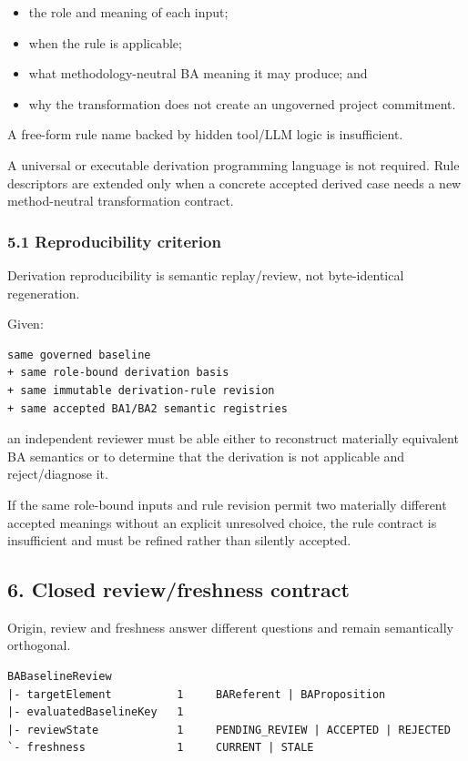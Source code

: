 \documentclass[11pt,a4paper]{article}
\providecommand{\tightlist}{\setlength{\itemsep}{0pt}\setlength{\parskip}{0pt}}
\begin{document}
\begin{itemize}
\tightlist
\item
  the role and meaning of each input;
\item
  when the rule is applicable;
\item
  what methodology-neutral BA meaning it may produce; and
\item
  why the transformation does not create an ungoverned project commitment.
\end{itemize}

A free-form rule name backed by hidden tool/LLM logic is insufficient.

A universal or executable derivation programming language is not required. Rule descriptors are extended only when a concrete accepted derived case needs a new method-neutral transformation contract.

\subsubsection{5.1 Reproducibility criterion}\label{reproducibility-criterion}

Derivation reproducibility is semantic replay/review, not byte-identical regeneration.

Given:

\begin{verbatim}
same governed baseline
+ same role-bound derivation basis
+ same immutable derivation-rule revision
+ same accepted BA1/BA2 semantic registries
\end{verbatim}

an independent reviewer must be able either to reconstruct materially equivalent BA semantics or to determine that the derivation is not applicable and reject/diagnose it.

If the same role-bound inputs and rule revision permit two materially different accepted meanings without an explicit unresolved choice, the rule contract is insufficient and must be refined rather than silently accepted.

\subsection{6. Closed review/freshness contract}\label{closed-reviewfreshness-contract}

Origin, review and freshness answer different questions and remain semantically orthogonal.

\begin{verbatim}
BABaselineReview
|- targetElement          1     BAReferent | BAProposition
|- evaluatedBaselineKey   1
|- reviewState            1     PENDING_REVIEW | ACCEPTED | REJECTED
`- freshness              1     CURRENT | STALE
\end{verbatim}
\end{document}
